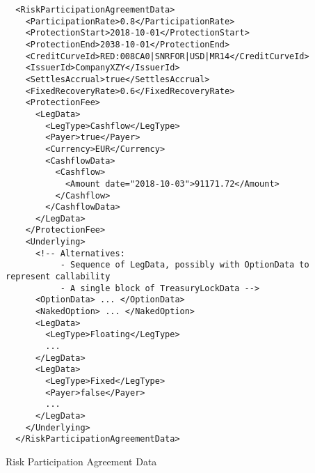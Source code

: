 \begin{listing}[H]
\begin{verbatim}
  <RiskParticipationAgreementData>
    <ParticipationRate>0.8</ParticipationRate>
    <ProtectionStart>2018-10-01</ProtectionStart>
    <ProtectionEnd>2038-10-01</ProtectionEnd>
    <CreditCurveId>RED:008CA0|SNRFOR|USD|MR14</CreditCurveId>
    <IssuerId>CompanyXZY</IssuerId>
    <SettlesAccrual>true</SettlesAccrual>
    <FixedRecoveryRate>0.6</FixedRecoveryRate>
    <ProtectionFee>
      <LegData>
        <LegType>Cashflow</LegType>
        <Payer>true</Payer>
        <Currency>EUR</Currency>
        <CashflowData>
          <Cashflow>
            <Amount date="2018-10-03">91171.72</Amount>
          </Cashflow>
        </CashflowData>
      </LegData>
    </ProtectionFee>
    <Underlying>
      <!-- Alternatives:
           - Sequence of LegData, possibly with OptionData to represent callability
           - A single block of TreasuryLockData -->
      <OptionData> ... </OptionData>
      <NakedOption> ... </NakedOption>
      <LegData>
        <LegType>Floating</LegType>
        ...
      </LegData>
      <LegData>
        <LegType>Fixed</LegType>
        <Payer>false</Payer>
        ...
      </LegData>
    </Underlying>
  </RiskParticipationAgreementData>
\end{verbatim}
\caption{Risk Participation Agreement Data}
\label{lst:rpadata}
\end{listing}


